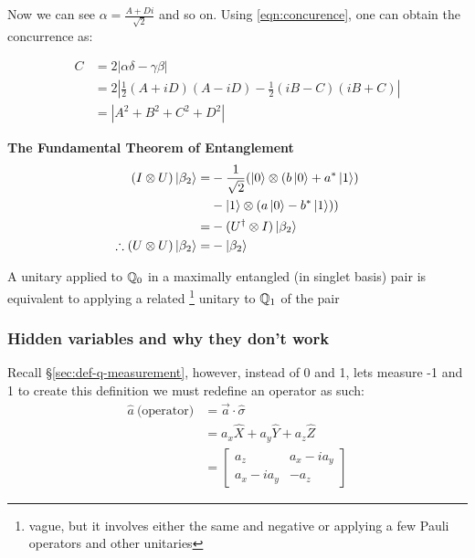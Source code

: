 \documentclass[reprint, amsmath,amssymb, aps]{revtex4-2}
\begin{document}
                Now we can see $\alpha = \frac{A+Di}{\sqrt{2}}$ and so on. Using \eqref{eqn:concurence}, one can obtain the concurrence as:

                \begin{align*}
                    C &= 2|\alpha\delta - \gamma\beta| \\
                      &= 2|\frac{1}{2}(A+iD)(A-iD) - \frac{1}{2}(iB-C)(iB+C)| \\
                      &= |A^2 + B^2 + C^2 + D^2| 
                \end{align*}

                \begin{theorem} \textbf{The Fundamental Theorem of Entanglement}
                    \begin{align*}
                        (I\otimes U)\ket{\beta_2} =& -\frac{1}{\sqrt{2}} (\ket{0}\otimes(b\ket{0}+a^*\ket{1})\\
                        &-\ket{1}\otimes(a\ket{0}-b^*\ket{1}))\\
                        =& -(U^\dagger\otimes I )\ket{\beta_2} \\
                        \therefore (U\otimes U)\ket{\beta_2} =& -\ket{\beta_2}
                    \end{align*}

                    A unitary applied to $\mathbb{Q}_0$ in a maximally entangled (in singlet basis) pair is equivalent to applying a related \footnote{vague, but it involves either the same and negative or applying a few Pauli operators and other unitaries} unitary to $\mathbb{Q}_1$ of the pair
                    
                \end{theorem}

                \subsubsection{Hidden variables and why they don't work}
                    Recall \S\ref{sec:def-q-measurement}, however, instead of 0 and 1, lets measure -1 and 1 to create this definition we must redefine an operator as such:
                    \begin{align*}
                    \hat{a} \ \text{(operator)} &= \vec{a}\cdot\hat{\sigma} \\
                    &= a_x\hat{X} +a_y\hat{Y}+a_z\hat{Z} \\
                    &= \begin{bmatrix}a_z & a_x - i a_y \\ a_x-ia_y & -a_z\end{bmatrix}
                    \end{align*}
    
\end{document}
